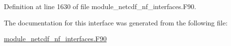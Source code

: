 Definition at line 1630 of file module\+\_\+netcdf\+\_\+nf\+\_\+interfaces.\+F90.



The documentation for this interface was generated from the following file\+:\begin{DoxyCompactItemize}
\item 
\hyperlink{module__netcdf__nf__interfaces_8F90}{module\+\_\+netcdf\+\_\+nf\+\_\+interfaces.\+F90}\end{DoxyCompactItemize}
